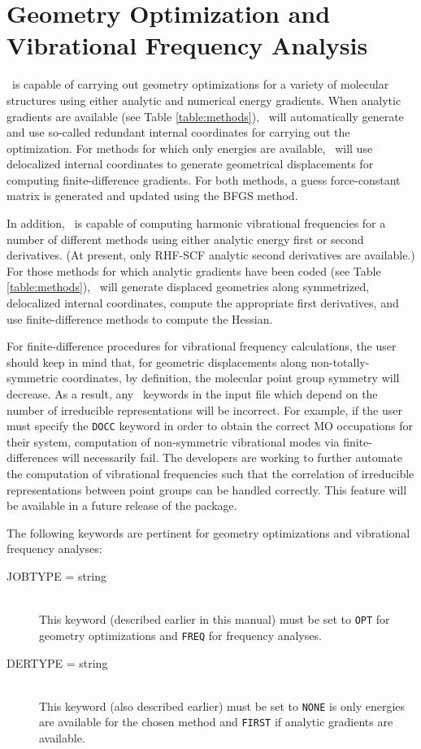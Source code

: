 \section{Geometry Optimization and Vibrational Frequency Analysis} \label{opt}

\PSIthree\ is capable of carrying out geometry optimizations for a variety of
molecular structures using either analytic and numerical energy gradients.
When analytic gradients are available (see Table \ref{table:methods}),
\PSIthree\ will automatically generate and use so-called redundant
internal coordinates for carrying out the optimization.  For methods
for which only energies are available, \PSIthree\ will use delocalized
internal coordinates to generate geometrical displacements for computing
finite-difference gradients.  For both methods, a guess force-constant
matrix is generated and updated using the BFGS method.

In addition, \PSIthree\ is capable of computing harmonic vibrational
frequencies for a number of different methods using either analytic energy
first or second derivatives.  (At present, only RHF-SCF analytic second
derivatives are available.)  For those methods for which analytic gradients
have been coded (see Table \ref{table:methods}), \PSIthree\ will generate
displaced geometries along symmetrized, delocalized internal coordinates,
compute the appropriate first derivatives, and use finite-difference
methods to compute the Hessian.

For finite-difference procedures for vibrational frequency calculations,
the user should keep in mind that, for geometric displacements along
non-totally-symmetric coordinates, by definition, the molecular point
group symmetry will decrease.  As a result, any \PSIthree\ keywords in
the input file which depend on the number of irreducible representations
will be incorrect.  For example, if the user must specify the {\tt DOCC}
keyword in order to obtain the correct MO occupations for their system,
computation of non-symmetric vibrational modes via finite-differences
will necessarily fail.  The developers are working to further automate
the computation of vibrational frequencies such that the correlation
of irreducible representations between point groups can be handled
correctly.  This feature will be available in a future release of the
package.

The following keywords are pertinent for geometry optimizations and
vibrational frequency analyses:
\begin{description}
\item[JOBTYPE = string]\mbox{}\\
This keyword (described earlier in this manual) must be set to
{\tt OPT} for geometry optimizations and {\tt FREQ} for frequency analyses.
\item[DERTYPE = string]\mbox{}\\
This keyword (also described earlier) must be set to {\tt NONE} is only
energies are available for the chosen method and {\tt FIRST} if analytic
gradients are available.
\end{description}
